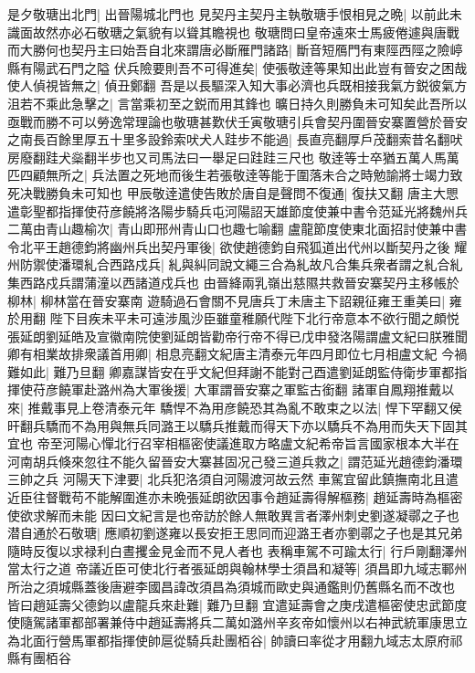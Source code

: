 是夕敬瑭出北門|{
	出晉陽城北門也}
見契丹主契丹主執敬瑭手恨相見之晩|{
	以前此未識面故然亦必石敬瑭之氣貌有以聳其瞻視也}
敬瑭問曰皇帝遠來士馬疲倦遽與唐戰而大勝何也契丹主曰始吾自北來謂唐必斷雁門諸路|{
	斷音短鴈門有東陘西陘之險嵉縣有陽武石門之隘}
伏兵險要則吾不可得進矣|{
	使張敬逹等果知出此豈有晉安之困哉}
使人偵視皆無之|{
	偵丑鄭翻}
吾是以長驅深入知大事必濟也兵既相接我氣方鋭彼氣方沮若不乘此急擊之|{
	言當乘初至之鋭而用其鋒也}
曠日持久則勝負未可知矣此吾所以亟戰而勝不可以勞逸常理論也敬瑭甚歎伏壬寅敬瑭引兵會契丹圍晉安寨置營於晉安之南長百餘里厚五十里多設鈴索吠犬人跬步不能過|{
	長直亮翻厚戶茂翻索昔名翻吠房廢翻跬犬橤翻半步也又司馬法曰一舉足曰跬跬三尺也}
敬逹等士卒猶五萬人馬萬匹四顧無所之|{
	兵法置之死地而後生若張敬逹等能于圍落未合之時勉諭將士竭力致死决戰勝負未可知也}
甲辰敬逹遣使告敗於唐自是聲問不復通|{
	復扶又翻}
唐主大愳遣彰聖都指揮使苻彦饒將洛陽步騎兵屯河陽詔天雄節度使兼中書令范延光將魏州兵二萬由青山趣榆次|{
	青山即邢州青山口也趣七喻翻}
盧龍節度使東北面招討使兼中書令北平王趙德鈞將幽州兵出契丹軍後|{
	欲使趙德鈞自飛狐道出代州以斷契丹之後}
耀州防禦使潘環糺合西路戍兵|{
	糺與糾同說文繩三合為糺故凡合集兵衆者謂之糺合糺集西路戍兵謂蒲潼以西諸道戍兵也}
由晉絳兩乳嶺出慈隰共救晉安寨契丹主移帳於柳林|{
	柳林當在晉安寨南}
遊騎過石會關不見唐兵丁未唐主下詔親征雍王重美曰|{
	雍於用翻}
陛下目疾未平未可遠涉風沙臣雖童稚願代陛下北行帝意本不欲行聞之頗悦張延朗劉延皓及宣徽南院使劉延朗皆勸帝行帝不得已戊申發洛陽謂盧文紀曰朕雅聞卿有相業故排衆議首用卿|{
	相息亮翻文紀唐主清泰元年四月即位七月相盧文紀}
今禍難如此|{
	難乃旦翻}
卿嘉謀皆安在乎文紀但拜謝不能對己酉遣劉延朗監侍衛步軍都指揮使苻彦饒軍赴潞州為大軍後援|{
	大軍謂晉安寨之軍監古銜翻}
諸軍自鳳翔推戴以來|{
	推戴事見上卷清泰元年}
驕悍不為用彦饒恐其為亂不敢束之以法|{
	悍下罕翻又侯旰翻兵驕而不為用與無兵同潞王以驕兵推戴而得天下亦以驕兵不為用而失天下固其宜也}
帝至河陽心憚北行召宰相樞密使議進取方略盧文紀希帝旨言國家根本大半在河南胡兵倏來忽往不能久留晉安大寨甚固况己發三道兵救之|{
	謂范延光趙德鈞潘環三帥之兵}
河陽天下津要|{
	北兵犯洛須自河陽渡河故云然}
車駕宜留此鎮撫南北且遣近臣往督戰苟不能解圍進亦未晩張延朗欲因事令趙延壽得解樞務|{
	趙延壽時為樞密使欲求解而未能}
因曰文紀言是也帝訪於餘人無敢異言者澤州刺史劉遂凝鄩之子也潜自通於石敬瑭|{
	應順初劉遂雍以長安拒王思同而迎潞王者亦劉鄩之子也是其兄弟隨時反復以求禄利白晝攫金見金而不見人者也}
表稱車駕不可踰太行|{
	行戶剛翻澤州當太行之道}
帝議近臣可使北行者張延朗與翰林學士須昌和凝等|{
	須昌即九域志鄆州所治之須城縣蓋後唐避李國昌諱改須昌為須城而歐史與通鑑則仍舊縣名而不改也}
皆曰趙延壽父德鈞以盧龍兵來赴難|{
	難乃旦翻}
宜遣延壽會之庚戌遣樞密使忠武節度使隨駕諸軍都部署兼侍中趙延壽將兵二萬如潞州辛亥帝如懷州以右神武統軍康思立為北面行營馬軍都指揮使帥扈從騎兵赴團栢谷|{
	帥讀曰率從才用翻九域志太原府祁縣有團栢谷}
